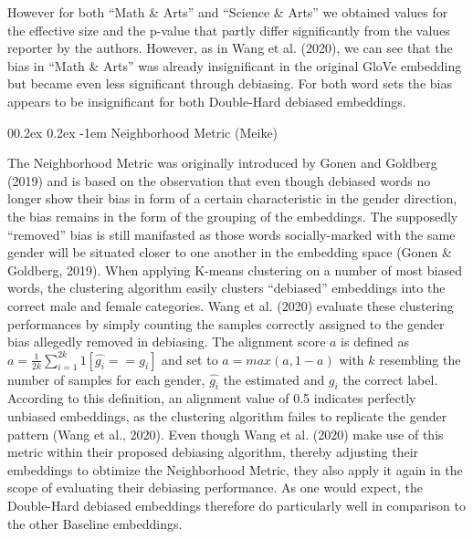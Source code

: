 \documentclass[
  english,
  man,floatsintext]{apa6}
\makeatletter
\let\oldparagraph\paragraph
\renewcommand{\paragraph}[1]{\oldparagraph{#1}\mbox{}}
\renewcommand{\paragraph}{\@startsection{paragraph}{4}{\parindent}%
  {0\baselineskip \@plus 0.2ex \@minus 0.2ex}%
  {-1em}%
  {\normalfont\normalsize\bfseries\itshape\typesectitle}}
\makeatother
\begin{document}
However for both ``Math \& Arts'' and ``Science \& Arts'' we obtained values for the effective size and the p-value that partly differ significantly from the values reporter by the authors. However, as in Wang et al. (2020), we can see that the bias in ``Math \& Arts'' was already insignificant in the original GloVe embedding but became even less significant through debiasing. For both word sets the bias appears to be insignificant for both Double-Hard debiased embeddings.

\hypertarget{neighborhood-metric-meike}{%
\paragraph{Neighborhood Metric (Meike)}\label{neighborhood-metric-meike}}

The Neighborhood Metric was originally introduced by Gonen and Goldberg (2019) and is based on the observation that even though debiased words no longer show their bias in form of a certain characteristic in the gender direction, the bias remains in the form of the grouping of the embeddings. The supposedly ``removed'' bias is still manifasted as those words socially-marked with the same gender will be situated closer to one another in the embedding space (Gonen \& Goldberg, 2019).
When applying K-means clustering on a number of most biased words, the clustering algorithm easily clusters ``debiased'' embeddings into the correct male and female categories.
Wang et al. (2020) evaluate these clustering performances by simply counting the samples correctly assigned to the gender bias allegedly removed in debiasing. The alignment score \(a\) is defined as \(a = \frac{1}{2k}\sum_{i=1}^{2k}1[\hat{g_{i}}== g_{i}]\) and set to \(a = max(a, 1-a)\) with \(k\) resembling the number of samples for each gender, \(\hat{g_{i}}\) the estimated and \(g_{i}\) the correct label. According to this definition, an alignment value of 0.5 indicates perfectly unbiased embeddings, as the clustering algorithm failes to replicate the gender pattern (Wang et al., 2020).
Even though Wang et al. (2020) make use of this metric within their proposed debiasing algorithm, thereby adjusting their embeddings to obtimize the Neighborhood Metric, they also apply it again in the scope of evaluating their debiasing performance. As one would expect, the Double-Hard debiased embeddings therefore do particularly well in comparison to the other Baseline embeddings.
\end{document}
